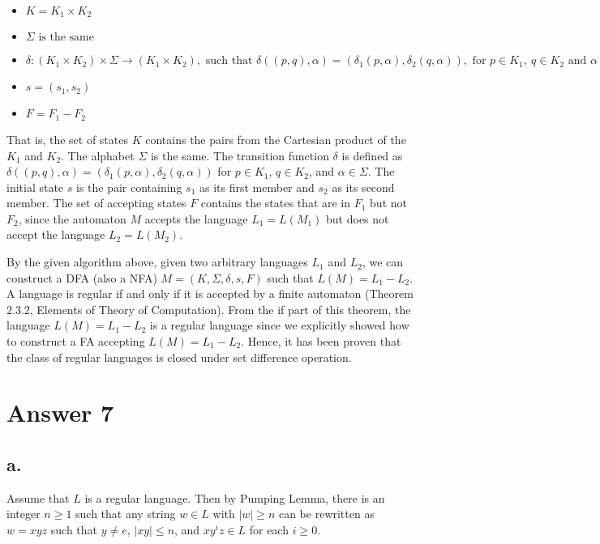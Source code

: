 \documentclass[12pt]{article}
\begin{document}
\begin{itemize}
        \item $K = K_1 \times K_2$
        \item $\Sigma \text{ is the same}$
        \item $\delta: (K_1 \times K_2) \times \Sigma \rightarrow (K_1 \times K_2), \text{ such that } \delta((p, q), \alpha) = (\delta_1(p ,\alpha), \delta_2(q, \alpha)), \text{ for } p \in K_1, \ q \in K_2 \text{ and } \alpha \in \Sigma$
        \item $s = (s_1, s_2)$
        \item $F = F_1 - F_2$
\end{itemize}
That is, the set of states $K$ contains the pairs from the Cartesian product of the $K_1$ and $K_2$. The alphabet $\Sigma$ is the same. The transition function $\delta$ is defined as $\delta((p, q), \alpha) = (\delta_1(p ,\alpha), \delta_2(q, \alpha))$ for $p \in K_1$, $q \in K_2$, and $\alpha \in \Sigma$. The initial state $s$ is the pair containing $s_1$ as its first member and $s_2$ as its second member. The set of accepting states $F$ contains the states that are in $F_1$ but not $F_2$, since the automaton $M$ accepts the language $L_1 = L(M_1)$ but does not accept the language $L_2 = L(M_2)$.

By the given algorithm above, given two arbitrary languages $L_1$ and $L_2$, we can construct a DFA (also a NFA) $M = (K, \Sigma, \delta, s, F)$ such that $L(M) = L_1 - L_2$. A language is regular if and only if it is accepted by a finite automaton (Theorem 2.3.2, Elements of Theory of Computation). From the if part of this theorem, the language $L(M) = L_1 - L_2$ is a regular language since we explicitly showed how to construct a FA accepting $L(M) = L_1 - L_2$. Hence, it has been proven that the class of regular languages is closed under set difference operation.



\section*{Answer 7}

\subsection*{a.}

Assume that $L$ is a regular language. Then by Pumping Lemma, there is an integer $n \geq 1$ such that any string $w \in L$ with $|w| \geq n$ can be rewritten as $w = xyz$ such that $y \neq e$, $|xy| \leq n$, and $xy^iz \in L$ for each $i \geq 0$.
\end{document}
